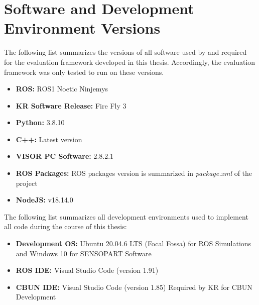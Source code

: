 \section{Software and Development Environment Versions}

The following list summarizes the versions of all software used by and required for the
evaluation framework developed in this thesis. Accordingly, the evaluation framework
was only tested to run on these versions.

\begin{itemize}
    \item \textbf{ROS:} ROS1 Noetic Ninjemys
    \item \textbf{KR Software Release:} Fire Fly 3
    \item \textbf{Python:} 3.8.10
    \item \textbf{C++:} Latest version
    \item \textbf{VISOR PC Software:} 2.8.2.1
    \item \textbf{ROS Packages:} ROS packages version is summarized in \textit{package.xml} of the project
    \item \textbf{NodeJS:} v18.14.0
\end{itemize}

The following list summarizes all development environments used to implement all code
during the course of this thesis:

\begin{itemize}
    \item \textbf{Development OS:} Ubuntu 20.04.6 LTS (Focal Fossa) for ROS Simulations and Windows 10 for SENSOPART Software
    \item \textbf{ROS IDE:} Visual Studio Code (version 1.91)
    \item \textbf{CBUN IDE:} Visual Studio Code (version 1.85) Required by KR for CBUN Development
\end{itemize}

\newpage